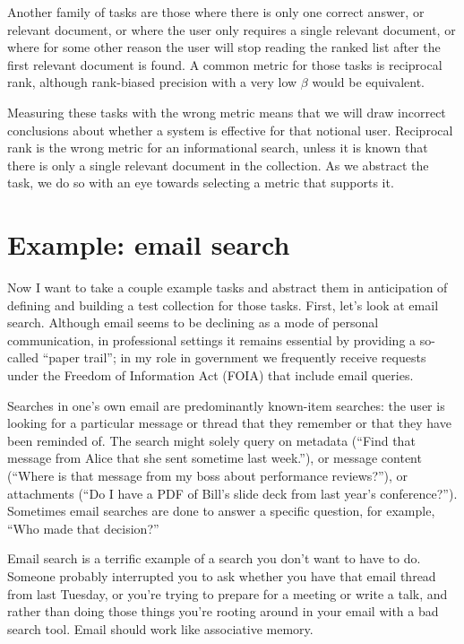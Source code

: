 \documentclass[nobib]{tufte-book}
\begin{document}
Another family of tasks are those where there is only one correct answer, or relevant document, or where the user only requires a single relevant document, or where for some other reason the user will stop reading the ranked list after the first relevant document is found.  A common metric for those tasks is reciprocal rank, although rank-biased precision with a very low $\beta$ would be equivalent.

Measuring these tasks with the wrong metric means that we will draw incorrect conclusions about whether a system is effective for that notional user.  Reciprocal rank is the wrong metric for an informational search, unless it is known that there is only a single relevant document in the collection.  As we abstract the task, we do so with an eye towards selecting a metric that supports it.

\section{Example: email search}

Now I want to take a couple example tasks and abstract them in anticipation of defining and building a test collection for those tasks.  First, let's look at email search.  Although email seems to be declining as a mode of personal communication, in professional settings it remains essential by providing a so-called ``paper trail''; in my role in government we frequently receive requests under the Freedom of Information Act (FOIA) that include email queries.

Searches in one's own email are predominantly known-item searches: the user is looking for a particular message or thread that they remember or that they have been reminded of.  The search might solely query on metadata (``Find that message from Alice that she sent sometime last week.''), or message content (``Where is that message from my boss about performance reviews?''), or attachments (``Do I have a PDF of Bill's slide deck from last year's conference?'').  Sometimes email searches are done to answer a specific question, for example, ``Who made that decision?''

Email search is a terrific example of a search you don't want to have to do.  Someone probably interrupted you to ask whether you have that email thread from last Tuesday, or you're trying to prepare for a meeting or write a talk, and rather than doing those things you're rooting around in your email with a bad search tool.  Email should work like associative memory.
\end{document}

